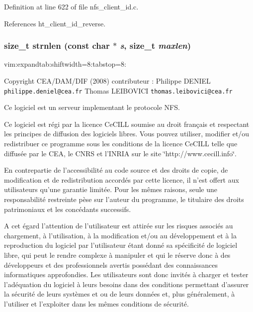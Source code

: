 Definition at line 622 of file nfs\_\-client\_\-id.c.

References ht\_\-client\_\-id\_\-reverse.
\subsubsection{\setlength{\rightskip}{0pt plus 5cm}size\_\-t strnlen (const char $\ast$ {\em s}, size\_\-t {\em maxlen})}\label{nfs__client__id_8c_a3}


vim:expandtab:shiftwidth=8:tabstop=8:

Copyright CEA/DAM/DIF (2008) contributeur : Philippe DENIEL {\tt philippe.deniel@cea.fr} Thomas LEIBOVICI {\tt thomas.leibovici@cea.fr}

Ce logiciel est un serveur implementant le protocole NFS.

Ce logiciel est r\'{e}gi par la licence Ce\-CILL soumise au droit fran\c{c}ais et respectant les principes de diffusion des logiciels libres. Vous pouvez utiliser, modifier et/ou redistribuer ce programme sous les conditions de la licence Ce\-CILL telle que diffus\'{e}e par le CEA, le CNRS et l'INRIA sur le site \char`\"{}http://www.cecill.info\char`\"{}.

En contrepartie de l'accessibilit\'{e} au code source et des droits de copie, de modification et de redistribution accord\'{e}s par cette licence, il n'est offert aux utilisateurs qu'une garantie limit\'{e}e. Pour les m\^{e}mes raisons, seule une responsabilit\'{e} restreinte p\`{e}se sur l'auteur du programme, le titulaire des droits patrimoniaux et les conc\'{e}dants successifs.

A cet \'{e}gard l'attention de l'utilisateur est attir\'{e}e sur les risques associ\'{e}s au chargement, \`{a} l'utilisation, \`{a} la modification et/ou au d\'{e}veloppement et \`{a} la reproduction du logiciel par l'utilisateur \'{e}tant donn\'{e} sa sp\'{e}cificit\'{e} de logiciel libre, qui peut le rendre complexe \`{a} manipuler et qui le r\'{e}serve donc \`{a} des d\'{e}veloppeurs et des professionnels avertis poss\'{e}dant des connaissances informatiques approfondies. Les utilisateurs sont donc invit\'{e}s \`{a} charger et tester l'ad\'{e}quation du logiciel \`{a} leurs besoins dans des conditions permettant d'assurer la s\'{e}curit\'{e} de leurs syst\`{e}mes et ou de leurs donn\'{e}es et, plus g\'{e}n\'{e}ralement, \`{a} l'utiliser et l'exploiter dans les m\^{e}mes conditions de s\'{e}curit\'{e}.

